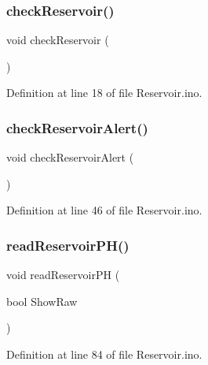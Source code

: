 \mbox{\label{_reservoir_8ino_acccd6ce7bdb6313d49ed7e1d15c34ade}} 
\subsubsection{\texorpdfstring{checkReservoir()}{checkReservoir()}}
{\footnotesize\ttfamily void check\+Reservoir (\begin{DoxyParamCaption}{ }\end{DoxyParamCaption})}



Definition at line 18 of file Reservoir.\+ino.

\mbox{\label{_reservoir_8ino_aef2e5b8e1e004b338fd8a02f634bbcd4}} 
\subsubsection{\texorpdfstring{checkReservoirAlert()}{checkReservoirAlert()}}
{\footnotesize\ttfamily void check\+Reservoir\+Alert (\begin{DoxyParamCaption}{ }\end{DoxyParamCaption})}



Definition at line 46 of file Reservoir.\+ino.

\mbox{\label{_reservoir_8ino_a1966fd92f689285f43d071fc9b6cd0a9}} 
\subsubsection{\texorpdfstring{readReservoirPH()}{readReservoirPH()}}
{\footnotesize\ttfamily void read\+Reservoir\+PH (\begin{DoxyParamCaption}\item[{bool}]{Show\+Raw }\end{DoxyParamCaption})}



Definition at line 84 of file Reservoir.\+ino.

